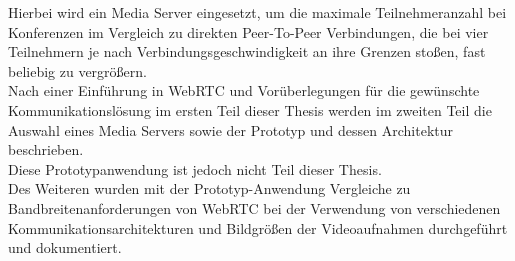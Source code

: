 Hierbei wird ein Media Server eingesetzt, um die maximale Teilnehmeranzahl bei Konferenzen im Vergleich zu direkten Peer-To-Peer Verbindungen, die bei vier Teilnehmern je nach Verbindungsgeschwindigkeit an ihre Grenzen stoßen, fast beliebig zu vergrößern.\\

Nach einer Einführung in WebRTC und Vorüberlegungen für die gewünschte Kommunikationslösung im ersten Teil dieser Thesis werden im zweiten Teil die Auswahl eines Media Servers sowie der Prototyp und dessen Architektur beschrieben.\\
Diese Prototypanwendung ist jedoch nicht Teil dieser Thesis.\\

Des Weiteren wurden mit der Prototyp-Anwendung Vergleiche zu Bandbreitenanforderungen von WebRTC bei der Verwendung von verschiedenen Kommunikationsarchitekturen und Bildgrößen der Videoaufnahmen durchgeführt und dokumentiert.\par

\vspace{\fill}

\endgroup